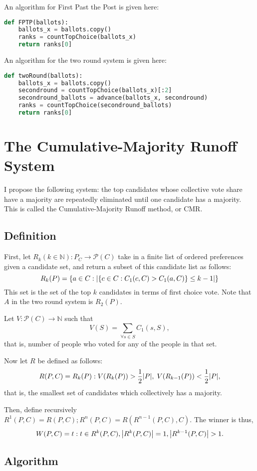 \documentclass{article}
\newcommand{\N}{\mathds{N}}
\begin{document}
An algorithm for First Past the Post is given here:
\begin{lstlisting}[language = Python]
def FPTP(ballots):
    ballots_x = ballots.copy()
    ranks = countTopChoice(ballots_x)
    return ranks[0]
\end{lstlisting}
An algorithm for the two round system is given here:
\begin{lstlisting}[language = Python]
def twoRound(ballots):
    ballots_x = ballots.copy()
    secondround = countTopChoice(ballots_x)[:2]
    secondround_ballots = advance(ballots_x, secondround)
    ranks = countTopChoice(secondround_ballots)
    return ranks[0]
\end{lstlisting}


\section{The Cumulative-Majority Runoff System}
I propose the following system: the top candidates whose collective vote share have a majority are repeatedly eliminated until one candidate has a majority. This is called the Cumulative-Majority Runoff method, or CMR.

\subsection{Definition}\label{defn}

First, let $R_k (k\in \N): P_C \to \mathcal{P}(C) $ take in a finite list of ordered preferences given a candidate set, and return a subset of this candidate list as follows:
$$ R_k(P) = \qty{a\in C  :  \abs{\qty{c\in C: C_1(c, C) > C_1(a, C)} \leq k-1}} $$
This set is the set of the top $k$ candidates in terms of first choice vote. Note that $A$ in the two round system is $R_2(P)$.

Let $V: \mathcal{P}(C) \to \N$ such that 
$$V(S) = \sum_{\forall s \in S} C_1(s, S),$$
that is, number of people who voted for any of the people in that set.

Now let $R$ be defined as follows:
$$R(P, C) = R_k(P) : V(R_k(P))>\frac{1}{2}\abs{P},\; V(R_{k-1}(P))<\frac{1}{2}\abs{P},$$
that is, the smallest set of candidates which collectively has a majority.

Then, define recursively $R^1(P,C) = R(P,C); R^n(P, C) = R(R^{n-1}(P, C), C).$ The winner is thus, $$W(P, C) = t: t\in R^k(P,C), \abs{R^k(P,C)} = 1, \abs{R^{k-1}(P,C)} > 1.$$

\subsection{Algorithm}
\end{document}
